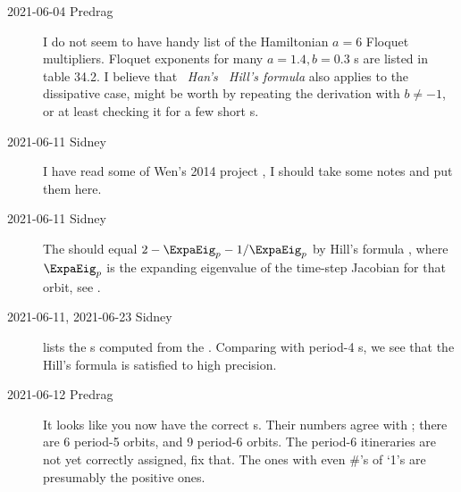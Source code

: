 \begin{description}
\item[2021-06-04 Predrag]
I do not seem to have handy list of the Hamiltonian $a=6$ {\HenonMap} Floquet
multipliers. Floquet exponents for many $a=1.4,b=0.3$ {\orbit}s are
listed in  {table 34.2}. I believe that
~{\em Han's  \HenonMap\ Hill's formula} also
applies to the dissipative case, might be worth by repeating the
derivation with $b\neq-1$, or at least checking it for a few short \po s.

\item[2021-06-11 Sidney]
I have read some of Wen's 2014 project , I
should take some notes and put them here.

\item[2021-06-11 Sidney]
The {\HillDet} should equal $2-\ExpaEig_p-{1}/{\ExpaEig_p}$ by Hill's formula
, where $\ExpaEig_p$ is the expanding eigenvalue of the
time-step Jacobian for that orbit, see .

\item[2021-06-11, 2021-06-23 Sidney]
 lists the {\HillDet}s
computed from the {\jacobianOrbs}.
Comparing with  period-4 {\HillDet}s, we see that the
Hill's formula  is satisfied to high precision.

\item[2021-06-12 Predrag]
It looks like you now have the correct {\HillDet}s. Their numbers agree with
; there are 6 period-5
orbits, and 9 period-6
orbits. The period-6 itineraries are not yet correctly assigned, fix that.
The ones with even \#'s of `1's are presumably the positive ones.


\end{description}
